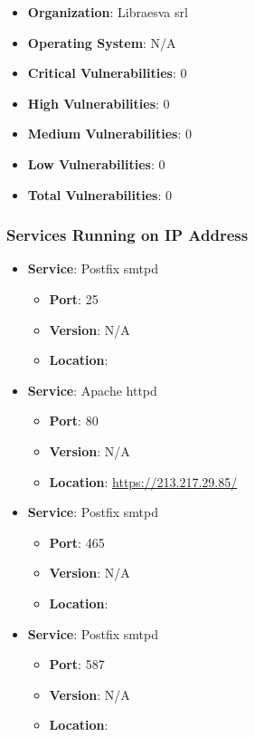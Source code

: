 \documentclass{article}
\begin{document}
\begin{itemize}
    \item \textbf{Organization}: Libraesva srl
    \item \textbf{Operating System}:  N/A 
    \item \textbf{Critical Vulnerabilities}: 0
    \item \textbf{High Vulnerabilities}: 0
    \item \textbf{Medium Vulnerabilities}: 0
    \item \textbf{Low Vulnerabilities}: 0
    \item \textbf{Total Vulnerabilities}: 0
\end{itemize}

\subsubsection*{Services Running on IP Address}

\begin{itemize}
    
        \item \textbf{Service}: Postfix smtpd
        \begin{itemize}
            \item \textbf{Port}: 25
            \item \textbf{Version}:  N/A 
            \item \textbf{Location}: \href{  }{  }
        \end{itemize}
    
        \item \textbf{Service}: Apache httpd
        \begin{itemize}
            \item \textbf{Port}: 80
            \item \textbf{Version}:  N/A 
            \item \textbf{Location}: \href{ https://213.217.29.85/ }{ https://213.217.29.85/ }
        \end{itemize}
    
        \item \textbf{Service}: Postfix smtpd
        \begin{itemize}
            \item \textbf{Port}: 465
            \item \textbf{Version}:  N/A 
            \item \textbf{Location}: \href{  }{  }
        \end{itemize}
    
        \item \textbf{Service}: Postfix smtpd
        \begin{itemize}
            \item \textbf{Port}: 587
            \item \textbf{Version}:  N/A 
            \item \textbf{Location}: \href{  }{  }
        \end{itemize}
    
\end{itemize}
\end{document}
